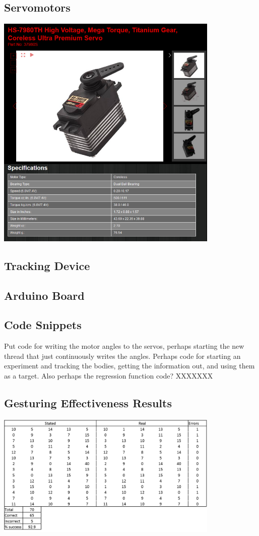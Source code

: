 \documentclass[11pt]{article}
\begin{document}
\subsection{Servomotors}

\begin{center}
\includegraphics[width=0.8\textwidth]{images/servoSpecs.png}
\label{figure:servoSpes}
\end{center}


\subsection{Tracking Device}
\subsection{Arduino Board}
\subsection{Code Snippets}
Put code for writing the motor angles to the servos, perhaps starting the new thread that just continuously writes the angles. Perhaps code for starting an experiment and tracking the bodies, getting the information out, and using them as a target. Also perhaps the regression function code? XXXXXXX

\subsection{Gesturing Effectiveness Results}

\begin{center}
\includegraphics[width=0.8\textwidth]{images/gestureTableResults.png}
\label{figure:gestureResults}
\end{center}
\end{document}
